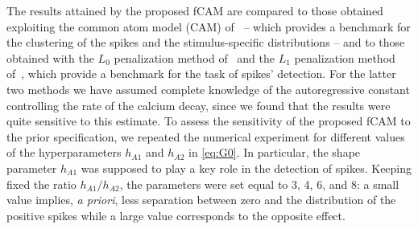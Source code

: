 The results attained by the proposed fCAM are compared to those obtained exploiting the common atom model (CAM) of~\textcite{denti2021} -- which provides a benchmark for the clustering of the spikes and the stimulus-specific distributions -- and to those obtained with the $L_0$ penalization method of~\textcite{jewell2019} and the $L_1$ penalization method of~\textcite{friedrich2017}, which provide a benchmark for the task of spikes' detection. For the latter two methods we have assumed complete knowledge of the autoregressive constant controlling the rate of the calcium decay, since we found that the results were quite sensitive to this estimate.
To assess the sensitivity of the proposed fCAM to the prior specification, we repeated the numerical experiment for different values of the hyperparameters $h_{A1}$ and $h_{A2}$ in \eqref{eq:G0}. In particular, the shape parameter $h_{A1}$ was supposed to play a key role in the detection of spikes. Keeping fixed the ratio $h_{A1}/h_{A2}$, the parameters were set equal to 3, 4, 6, and 8: a small value implies, \textit{a priori}, less separation between zero and the distribution of the positive spikes while a large value corresponds to the opposite effect. 



